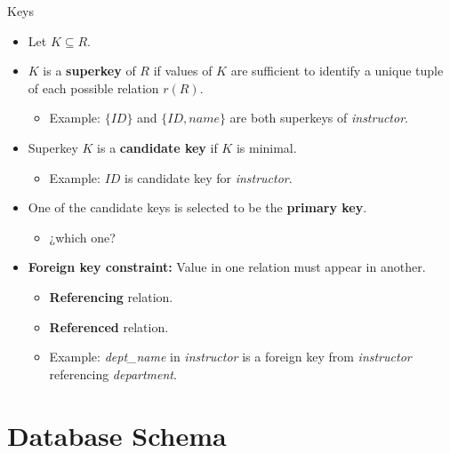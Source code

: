 \documentclass{beamer}
\begin{document}
\begin{frame}{Keys}
    \begin{itemize}
        \item Let $K \subseteq R$.
        \item $K$ is a \textbf{superkey} of $R$ if values of $K$ are sufficient to identify a unique tuple of each possible relation $r(R)$.
        \begin{itemize}
            \item Example: $\{ID\}$ and $\{ID, name\}$ are both superkeys of \textit{instructor}. 
        \end{itemize}
        \item Superkey $K$ is a \textbf{candidate key} if $K$ is minimal.
        \begin{itemize}
            \item Example: ${ID}$ is candidate key for \textit{instructor}. 
        \end{itemize}
        \item One of the candidate keys is selected to be the \textbf{primary key}.
        \begin{itemize}
            \item ¿which one? 
        \end{itemize}
        \item \textbf{Foreign key constraint:} Value in one relation must appear in another.
        \begin{itemize}
            \item \textbf{Referencing} relation.
            \item \textbf{Referenced} relation.
            \item Example: \textit{dept\_name} in \textit{instructor} is a foreign key from \textit{instructor} referencing \textit{department}.
        \end{itemize}
    \end{itemize}
\end{frame}

\section{Database Schema}
\end{document}
